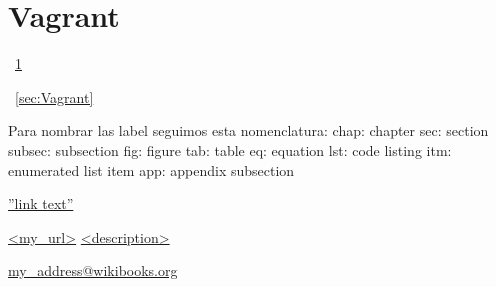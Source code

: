 \section{Vagrant}\label{sec:Vagrant}

~\ref{sec:Vagrant} %

~\autoref{sec:Vagrant} %


Para nombrar las label seguimos esta nomenclatura:
chap:	chapter
sec:	section
subsec:	subsection
fig:	figure
tab:	table
eq:	equation
lst:	code listing
itm:	enumerated list item
app:	appendix subsection


\usepackage{hyperref}

\hyperref[label_name]{''link text''}

\url{<my_url>}
\href{<my_url>}{<description>}

\href{mailto:my_address@wikibooks.org}{my\_address@wikibooks.org}


